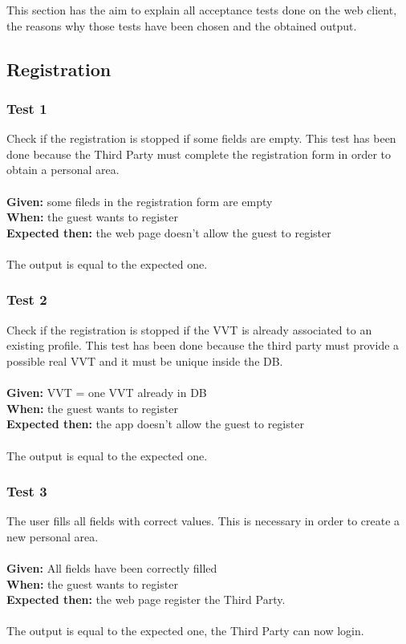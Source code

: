 This section has the aim to explain all acceptance tests done on the web client, the reasons why those tests have been chosen and the obtained output.

\subsection{Registration}

\subsubsection{\Large{Test 1}}
Check if the registration is stopped if some fields are empty. This test has been done because the Third Party must complete the registration form in order to obtain a personal area.\\
\\
\textbf{Given: } some fileds in the registration form are empty\\
\textbf{When: } the guest wants to register\\
\textbf{Expected then: } the web page doesn't allow the guest to register\\
\\
The output is equal to the expected one.

\subsubsection{\Large{Test 2}}
Check if the registration is stopped if the VVT is already associated to an existing profile. This test has been done because the third party must provide a possible real VVT and it must be unique inside the DB.\\
\\
\textbf{Given: } VVT = one VVT already in DB\\
\textbf{When: } the guest wants to register\\
\textbf{Expected then: } the app doesn't allow the guest to register\\
\\
The output is equal to the expected one.

\subsubsection{\Large{Test 3}}
The user fills all fields with correct values. This is necessary in order to create a new personal area.\\
\\
\textbf{Given: } All fields have been correctly filled\\
\textbf{When: } the guest wants to register\\
\textbf{Expected then: } the web page register the Third Party.\\
\\
The output is equal to the expected one, the Third Party can now login.

